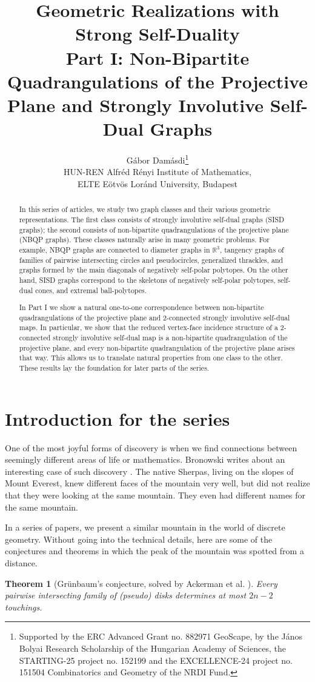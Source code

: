 \documentclass{article}
\title{Geometric Realizations with Strong Self-Duality \\[0.5em] \large Part I: Non-Bipartite Quadrangulations of the Projective Plane and Strongly Involutive Self-Dual Graphs}
\author{Gábor Damásdi\footnote{Supported by the ERC Advanced Grant no. 882971 GeoScape, by the János Bolyai Research Scholarship of the Hungarian Academy of Sciences, the STARTING-25 project no. 152199 and the EXCELLENCE-24 project no. 151504 Combinatorics and Geometry of the NRDI Fund.} \\ \small HUN-REN Alfr\'ed R\'enyi Institute of Mathematics,\\ \small ELTE Eötvös Loránd University, Budapest }
\newtheorem{theorem}{Theorem}[section]
\begin{document}
\maketitle
\begin{abstract}
   In this series of articles, we study two graph classes and their various geometric representations. The first class consists of strongly involutive self-dual graphs (SISD graphs); the second consists of non-bipartite quadrangulations of the projective plane (NBQP graphs). These classes naturally arise in many geometric problems. For example, NBQP graphs are connected to diameter graphs in $\mathbb{R}^3$, tangency graphs of families of pairwise intersecting circles and pseudocircles, generalized thrackles, and graphs formed by the main diagonals of negatively self-polar polytopes. On the other hand, SISD graphs correspond to the skeletons of negatively self-polar polytopes, self-dual cones, and extremal ball-polytopes. 
    
    In Part I we show a natural one-to-one correspondence between non-bipartite quadrangulations of the projective plane and 2-connected strongly involutive self-dual maps. In particular, we show that the reduced vertex-face incidence structure of a 2-connected strongly involutive self-dual map is a non-bipartite quadrangulation of the projective plane, and every non-bipartite quadrangulation of the projective plane arises that way. This allows us to translate natural properties from one class to the other. These results lay the foundation for later parts of the series. 
\end{abstract}
\section{Introduction for the series}
One of the most joyful forms of discovery is when we find connections between seemingly different areas of life or mathematics. Bronowski writes about an interesting case of such discovery \cite{bronowski1956}. The native Sherpas, living on the slopes of Mount Everest, knew different faces of the mountain very well, but did not realize that they were looking at the same mountain. They even had different names for the same mountain. 

In a series of papers, we present a similar mountain in the world of discrete geometry. Without going into the technical details, here are some of the conjectures and theorems in which the peak of the mountain was spotted from a distance. 


\begin{theorem}[Grünbaum's conjecture, solved by Ackerman et al. \cite{pseudodamasdi}]\label{thm:listgr}
    Every pairwise intersecting family of (pseudo) disks determines at most $2n-2$ touchings.
\end{theorem}
\end{document}
